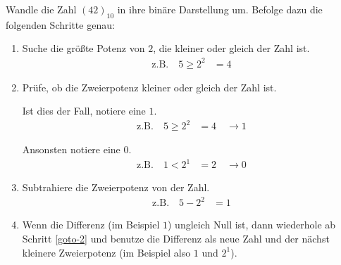 \documentclass[10pt, a5paper]{arbeitsblatt}
\begin{document}
\begin{aufgabe}
	Wandle die Zahl $(42)_{10}$ in ihre binäre Darstellung um. Befolge
	dazu die folgenden Schritte genau:
	\begin{enumerate}
		\item Suche die größte Potenz von $2$, die kleiner oder gleich der
		      Zahl ist.
		      \begin{align*}
			      \text{z.B.}\quad 5 \geq 2^2 & = 4
		      \end{align*}
		\item \label{goto-2} Prüfe, ob die Zweierpotenz kleiner oder gleich der
		      Zahl ist.

		      Ist dies der Fall, notiere eine $1$.
		      \begin{align*}
			      \text{z.B.}\quad 5 \geq 2^2 & = 4 \quad\longrightarrow 1
		      \end{align*}

		      Ansonsten notiere eine $0$.
		      \begin{align*}
			      \text{z.B.}\quad 1 < 2^1 & = 2 \quad\longrightarrow 0
		      \end{align*}
		\item Subtrahiere die Zweierpotenz von der Zahl.
		      \begin{align*}
			      \text{z.B.}\quad 5-2^2 & = 1
		      \end{align*}
		\item Wenn die Differenz (im Beispiel $1$) ungleich Null ist, dann
		      wiederhole ab Schritt \ref{goto-2} und benutze die Differenz als neue
		      Zahl und der nächst kleinere Zweierpotenz (im Beispiel also
		      $1$ und $2^1$).
	\end{enumerate}
\end{aufgabe}
\end{document}
